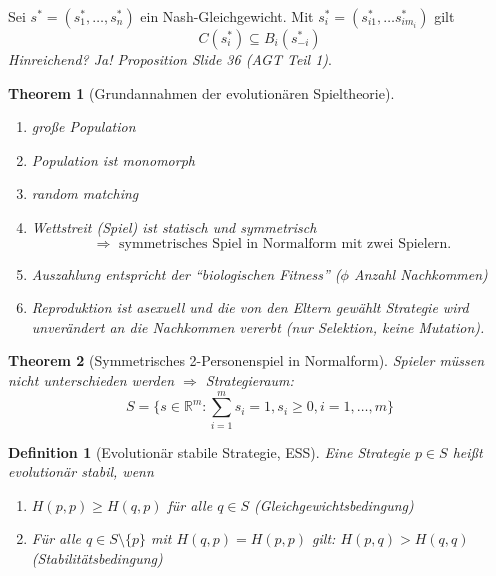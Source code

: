 \documentclass[12pt]{extreport} %
\newcommand{\R}{\mathbb{R}}
\theoremstyle{named}
\newtheorem{unnamedtheorem}{Theorem} \counterwithin{unnamedtheorem}{chapter}
\theoremstyle{itshape}
\newtheorem*{definition}{Definition}
\theoremstyle{normal}
\begin{document}
Sei $s^{*} = \left( s_{1}^{*}, \dotsc, s_{n}^{*} \right)$ ein Nash-Gleichgewicht. Mit $s_{i}^{*} = (s_{i1}^{*}, \dotsc s_{im_{i}}^{*})$ gilt
$$ C(s_{i}^{*}) \subseteq B_{i}(s_{-i}^{*}) $$
 \textit{Hinreichend? Ja! Proposition Slide 36 (AGT Teil 1)}.


\begin{unnamedtheorem}[Grundannahmen der evolutionären Spieltheorie]
	\begin{enumerate}
		\item große Population
		\item Population ist monomorph
		\item random matching
		\item Wettstreit (Spiel) ist statisch und symmetrisch
			$$ \Rightarrow \text{ symmetrisches Spiel in Normalform mit zwei Spielern}. $$
		\item Auszahlung entspricht der \enquote{biologischen Fitness} ($\phi$ Anzahl Nachkommen)
		\item Reproduktion ist asexuell und die von den Eltern gewählt Strategie wird unverändert an die Nachkommen vererbt (nur Selektion, keine Mutation).
	\end{enumerate}
\end{unnamedtheorem} 
 

\begin{unnamedtheorem}[Symmetrisches 2-Personenspiel in Normalform]
	Spieler müssen nicht unterschieden werden $\Rightarrow$ Strategieraum:
	$$ S = \{ s\in \R^{m} : \sum_{i=1}^{m} s_{i} = 1, s_{i} \geq 0, i = 1, \dotsc, m \} $$
\end{unnamedtheorem}
  
 
\begin{definition}[Evolutionär stabile Strategie, ESS]
	Eine Strategie $p \in S$ hei{\ss}t evolutionär stabil, wenn
	\begin{enumerate}
		\item $H(p,p) \geq H(q, p)$ für alle $q \in S$ (Gleichgewichtsbedingung)
		\item Für alle $q \in S \setminus \{ p \}$ mit $H(q, p) = H(p, p)$ gilt: $H(p, q) > H(q, q)$ (Stabilitätsbedingung)
	\end{enumerate}
\end{definition}  
\end{document}
